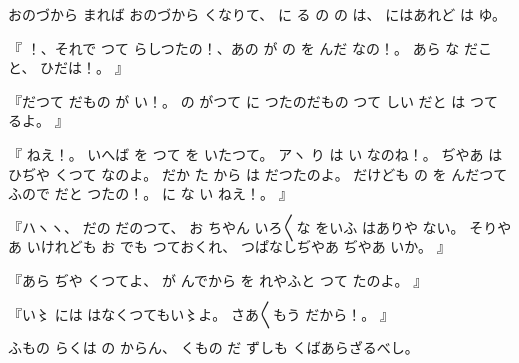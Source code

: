 おのづから
まれば
おのづから
くなりて、
に
る
の
の
は、
にはあれど
は
ゆ。

『
！、それで
つて
らしつたの！、あの
が
の
を
んだ
なの！。
あら
な
だこと、
ひだは！。
』

『だつて
だもの
が
い！。
の
がつて
に
つたのだもの
つて
しい
だと
は
つて
るよ。
』

『
ねえ！。
いへば
を
つて
を
いたつて。
アヽ
り
は
い
なのね！。
ぢやあ
は
ひぢや
くつて
なのよ。
だか
た
から
は
だつたのよ。
だけども
の
を
んだつて
ふので
だと
つたの！。
に
な
い
ねえ！。
』

『ハヽヽ、
だの
だのつて、
お
ちやん
いろ〳〵な
をいふ
はありや
ない。
そりやあ
いけれども
お
でも
つておくれ、
つぱなしぢやあ
ぢやあ
いか。
』

『あら
ぢや
くつてよ、
が
んでから
を
れやふと
つて
たのよ。
』

『い〻
には
はなくつてもい〻よ。
さあ〳〵もう
だから！。
』

ふもの
らくは
の
からん、
くもの
だ
ずしも
くばあらざるべし。

